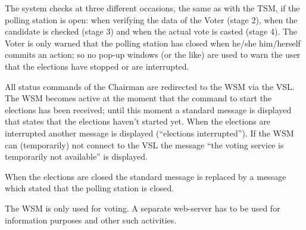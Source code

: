 The system checks at three different occasions, the same as with the
TSM, if the polling station is open: when verifying the data of the
Voter (stage 2), when the candidate is checked (stage 3) and when the
actual vote is casted (stage 4). The Voter is only warned that the
polling station has closed when he/she him/herself commits an action;
so no pop-up windows (or the like) are used to warn the user that the
elections have stopped or are interrupted.

All status commands of the Chairman are redirected to the WSM via the
VSL. The WSM becomes active at the moment that the command to start
the elections has been received; until this moment a standard message
is displayed that states that the elections haven't started yet. When
the elections are interrupted another message is displayed
(``elections interrupted''). If the WSM can (temporarily) not connect
to the VSL the message ``the voting service is temporarily not
available'' is displayed.

When the elections are closed the standard message is replaced by a
message which stated that the polling station is closed.	

The WSM is only used for voting. A separate web-server has to be used
for information purposes and other such activities.


